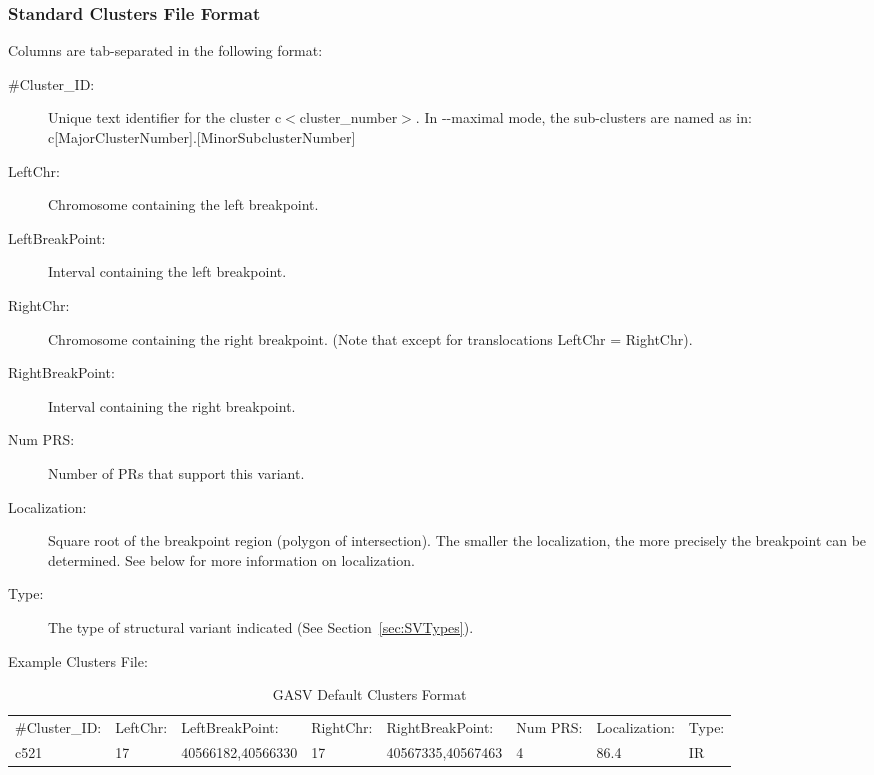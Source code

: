 \documentclass[11pt]{article}
\begin{document}
\subsubsection{Standard Clusters File Format}

Columns are tab-separated in the following format:

\begin{framed}
\begin{description}

\item[\#Cluster\_ID:]            Unique text identifier for the cluster
                         c$<$cluster\_number$>$. In -{}-maximal mode, the
                         sub-clusters are named as in:
                         c[MajorClusterNumber].[MinorSubclusterNumber]

\item[LeftChr:]                Chromosome containing the left breakpoint.

\item[LeftBreakPoint:]         Interval containing the left breakpoint.

\item[RightChr:]               Chromosome containing the right breakpoint.
			(Note that except for translocations LeftChr = RightChr).

\item[RightBreakPoint:]        Interval containing the right breakpoint.

\item[Num PRS:]                Number of PRs that support this variant.

\item[Localization:]           Square root of the breakpoint region (polygon of
                        intersection). The smaller the localization, the more
                        precisely the breakpoint can be determined. See below
                        for more information on localization.

\item[Type:]                   The type of structural variant indicated (See Section~\ref{sec:SVTypes}).
\end{description}
\end{framed}


\noindent Example Clusters File:


\begin{table}[htbp]\footnotesize
   \centering
   \begin{tabular}{ llllllll } %
 \#Cluster\_ID:  &  LeftChr:   &  LeftBreakPoint: & RightChr:  &  RightBreakPoint:   &     Num PRS:  &  Localization:  &  Type: \\
		c521  &  17  &    40566182,40566330   &    17     &  40567335,40567463   &    4  &     86.4&    IR
    \end{tabular}
   \caption{GASV Default Clusters Format}
   \label{tab:booktabs}
\end{table}
\end{document}
